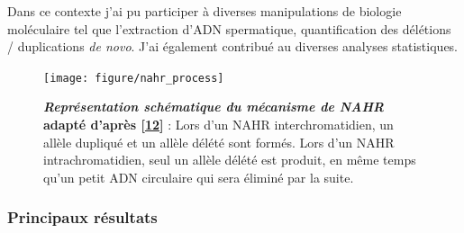 \documentclass[12pt,twoside]{ugathesis}
\begin{document}
Dans ce contexte j'ai pu participer à diverses manipulations de biologie
moléculaire tel que l'extraction d'ADN spermatique, quantification des
délétions / duplications \emph{de novo}. J'ai également contribué au
diverses analyses statistiques.

\newpage 

\begin{figure}

{\centering \texttt{[image: figure/nahr\_process]} 

}

\caption[Représentation schématique du mécanisme de NAHR]{\textbf{\emph{Représentation schématique du mécanisme de
NAHR} adapté d'après {[}\protect\hyperlink{ref-Pierre2012}{12}{]}} :
Lors d'un NAHR interchromatidien, un allèle dupliqué et un allèle délété
sont formés. Lors d'un NAHR intrachromatidien, seul un allèle délété est
produit, en même temps qu'un petit ADN circulaire qui sera éliminé par
la suite.}\label{fig:pictnahr}
\end{figure}








\newpage



\newpage

\subsubsection{Principaux résultats}\label{principaux-resultats-5}
\end{document}
